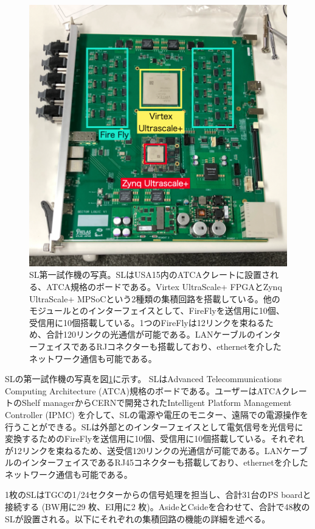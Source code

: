 \begin{figure} 
    \centering
    \includegraphics[width=14cm]{fig/Intro/TGC_SL.jpg}
    \caption[SL第一試作機の写真]{SL第一試作機の写真。SLはUSA15内のATCAクレートに設置される、ATCA規格のボードである。Virtex UltraScale+ FPGAとZynq UltraScale+ MPSoCという2種類の集積回路を搭載している。他のモジュールとのインターフェイスとして、FireFlyを送信用に10個、受信用に10個搭載している。1つのFireFlyは12リンクを束ねるため、合計120リンクの光通信が可能である。LANケーブルのインターフェイスであるRJコネクターも搭載しており、ethernetを介したネットワーク通信も可能である。}
    \label{TGC_SL}
\end{figure}

SLの第一試作機の写真を図\ref{TGC_SL}に示す。
SLはAdvanced Telecommunications Computing Architecture (ATCA)規格のボードである。ユーザーはATCAクレートのShelf managerからCERNで開発されたIntelligent Platform Management Controller  (IPMC) を介して、SLの電源や電圧のモニター、遠隔での電源操作を行うことができる。SLは外部とのインターフェイスとして電気信号を光信号に変換するためのFireFlyを送信用に10個、受信用に10個搭載している。それぞれが12リンクを束ねるため、送受信120リンクの光通信が可能である。LANケーブルのインターフェイスであるRJ45コネクターも搭載しており、ethernetを介したネットワーク通信も可能である。

1枚のSLはTGCの1/24セクターからの信号処理を担当し、合計31台のPS boardと接続する (BW用に29 枚、EI用に2 枚)。AsideとCsideを合わせて、合計で48枚のSLが設置される。以下にそれぞれの集積回路の機能の詳細を述べる。

